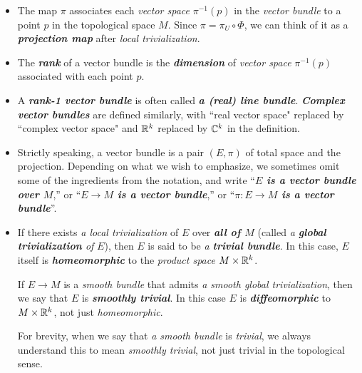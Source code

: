 \documentclass[11pt]{article}
\begin{document}
\begin{itemize}
\item \begin{remark}
The map $\pi$ associates each \emph{vector space} $\pi^{-1}(p)$ in the \emph{vector bundle} to a point $p$ in the topological space $M$. Since $\pi = \pi_{U} \circ \Phi$, we can think of it as a \emph{\textbf{projection map}} after \emph{local trivialization}.
\end{remark}

\item \begin{remark}
The \emph{\textbf{rank}} of a vector bundle is the \emph{\textbf{dimension}} of \emph{vector space} $\pi^{-1}(p)$ associated with each point $p$.
\end{remark}

\item \begin{remark}
A \emph{\textbf{rank-1 vector bundle}} is often called \emph{\textbf{a (real) line bundle}}. \emph{\textbf{Complex vector bundles}} are defined similarly, with ``real vector space" replaced by ``complex vector space" and ${\mathbb R}^k$ replaced by ${\mathbb C}^k$ in the definition. 
\end{remark}

\item \begin{remark} Strictly speaking, a vector bundle is a pair $(E, \pi)$ of total space and the projection.  Depending on what we wish to emphasize, we sometimes omit some of the ingredients from the notation, and write ``\emph{\textbf{$E$ is a vector bundle over $M$}},'' or ``\emph{\textbf{$E \rightarrow M$ is a vector bundle}},'' or ``\emph{\textbf{$\pi: E \rightarrow M$ is a vector bundle}}''.
\end{remark}

\item \begin{definition}
If there exists \emph{a local trivialization} of $E$ over \emph{\textbf{all of $M$}} (called \emph{a \textbf{global trivialization} of} $E$), then $E$ is said to be \emph{a \textbf{trivial bundle}}. In this case, $E$ itself is \emph{\textbf{homeomorphic}} to the \emph{product space} $M \times {\mathbb R}^k$. 

If $E \rightarrow M$ is a \emph{smooth bundle} that admits \emph{a smooth global trivialization}, then we say that $E$ is \emph{\textbf{smoothly trivial}}. In this case $E$
is \emph{\textbf{diffeomorphic}} to $M \times {\mathbb R}^k$, not just \emph{homeomorphic}. 
\end{definition}
For brevity, when we say that \emph{a smooth bundle} is \emph{trivial}, we always understand this to mean \emph{smoothly trivial}, not just trivial in the topological sense.



\end{itemize}
\end{document}

